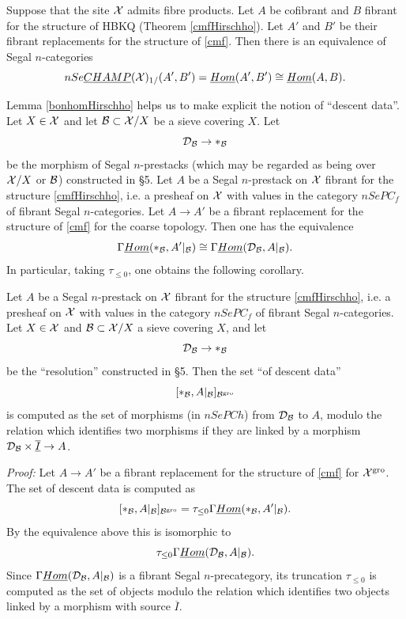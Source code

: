 \begin{lemma}
\label{bonhomHirschho2}
Suppose that the site ${\cal X}$ admits fibre products.
Let $A$ be cofibrant and $B$ fibrant for the structure of
HBKQ (Theorem \ref{cmfHirschho}). Let $A'$ and $B'$ be
their fibrant replacements for the structure of \ref{cmf}. Then
there is an equivalence of Segal $n$-categories
$$
nSe\underline{CHAMP}({\cal X} )_{1/}(A',B')=\underline{Hom}(A',B')\cong
\underline{Hom}(A,B).
$$
\end{lemma}
\eop

Lemma \ref{bonhomHirschho} helps us to make explicit the notion of ``descent
data''. Let $X\in {\cal X}$ and let ${\cal B} \subset {\cal X} /X$ be a sieve
covering $X$. Let
$$
{\cal D}_{{\cal B}} \rightarrow \ast _{{\cal B}}
$$
be the morphism of Segal $n$-prestacks (which may be regarded as
being over ${\cal X} /X$ or ${\cal B}$) constructed in \S 5.
Let $A$ be a Segal $n$-prestack on ${\cal X}$ fibrant for the structure
\ref{cmfHirschho}, i.e. a presheaf on ${\cal X}$ with values in the
category
$nSePC_f$ of fibrant Segal $n$-categories.
Let $A\rightarrow A'$ be a fibrant replacement for the structure of \ref{cmf}
for the coarse topology. Then one has the equivalence
$$
\Gamma \underline{Hom} (\ast _{{\cal B}}, A'|_{{\cal B}})
\cong \Gamma \underline{Hom}({\cal D}_{{\cal B}}, A|_{{\cal B}}).
$$
In particular, taking $\tau _{\leq 0}$,
one obtains
the following corollary.

\begin{corollary}
\label{calculDescente}
Let $A$ be a Segal $n$-prestack on ${\cal X}$ fibrant for the structure
\ref{cmfHirschho}, i.e. a presheaf on ${\cal X}$ with values in the
category
$nSePC_f$ of fibrant Segal $n$-categories.
Let $X\in {\cal X}$ and  ${\cal B} \subset {\cal X} /X$ a sieve covering $X$, and let
$$
{\cal D}_{{\cal B}} \rightarrow \ast _{{\cal B}}
$$
be the ``resolution'' constructed in \S 5. Then the set
``of descent data''
$$
[\ast _{{\cal B}}, A|_{{\cal B}}]_{{\cal B} ^{\rm
gro}}
$$
is computed as the set of morphisms (in $nSePCh$) from ${\cal
D}_{{\cal B}}$ to
$A$, modulo the relation which
identifies two morphisms if they are linked by a
morphism ${\cal D}_{{\cal B}} \times \underline{\overline{I}}\rightarrow A$.
\end{corollary}
{\em Proof:}
Let $A\rightarrow A'$ be a fibrant replacement for the structure of \ref{cmf}
for ${\cal X} ^{\rm gro}$.
The set of descent data is computed as
$$
[\ast _{{\cal B}}, A|_{{\cal B}}]_{{\cal B} ^{\rm
gro}}
=\tau _{\leq 0}\Gamma \underline{Hom} (\ast _{{\cal B}}, A'|_{{\cal B}}).
$$
By the equivalence above this is isomorphic to
$$
\tau _{\leq 0}\Gamma \underline{Hom} ({\cal D}_{{\cal B}}, A|_{{\cal B}}).
$$
Since
$\Gamma \underline{Hom} ({\cal D}_{{\cal B}}, A|_{{\cal B}})$ is a fibrant Segal
$n$-precategory, its truncation $\tau _{\leq 0}$ is computed as the set of
objects
modulo the relation which identifies
two objects linked by a morphism with source $\overline{I}$.
\eop

